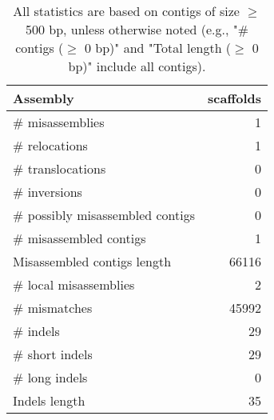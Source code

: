 \documentclass[12pt,a4paper]{article}
\begin{document}
\begin{table}[ht]
\begin{center}
\caption{All statistics are based on contigs of size $\geq$ 500 bp, unless otherwise noted (e.g., "\# contigs ($\geq$ 0 bp)" and "Total length ($\geq$ 0 bp)" include all contigs).}
\begin{tabular}{|l*{1}{|r}|}
\hline
Assembly & scaffolds \\ \hline
\# misassemblies & 1 \\ \hline
\hspace{5mm}\# relocations & 1 \\ \hline
\hspace{5mm}\# translocations & 0 \\ \hline
\hspace{5mm}\# inversions & 0 \\ \hline
\# possibly misassembled contigs & 0 \\ \hline
\# misassembled contigs & 1 \\ \hline
Misassembled contigs length & 66116 \\ \hline
\# local misassemblies & 2 \\ \hline
\# mismatches & 45992 \\ \hline
\# indels & 29 \\ \hline
\hspace{5mm}\# short indels & 29 \\ \hline
\hspace{5mm}\# long indels & 0 \\ \hline
Indels length & 35 \\ \hline
\end{tabular}
\end{center}
\end{table}
\end{document}
